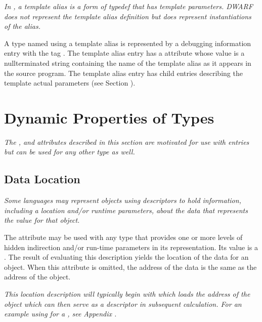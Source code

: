 \textit{In , a template alias is a form of typedef that has template
parameters.  DWARF does not represent the template alias definition
but does represent instantiations of the alias.}

A type named using a template alias is represented
by a debugging information entry 
with the tag
\DWTAGtemplatealiasTARG. 
The template alias entry has a
\DWATname{} attribute 
whose value is a null\dash terminated string
containing the name of the template alias as it appears in
the source program.
The template alias entry has child entries describing the template
actual parameters (see Section ).


\section{Dynamic Properties of Types}
\label{chap:dynamicpropertiesoftypes}
\textit{The \DWATdatalocation, \DWATallocated{} and \DWATassociated{}
attributes described in this section are motivated for use with
\DWTAGdynamictype{} entries but can be used for any other type as well.}

\subsection{Data Location}
\label{chap:datalocation}

\textit{Some languages may represent objects using descriptors to hold
information, including a location and/or run\dash time parameters,
about the data that represents the value for that object.}

\hypertarget{chap:DWATdatalocationindirectiontoactualdata}{}
The \DWATdatalocationDEFN{} attribute 
may be used with any type that provides one or more levels of 
hidden indirection
and/or run-time parameters in its representation. Its value
is a . 
The result of evaluating this
description yields the location of the data for an object.
When this attribute is omitted, the address of the data is
the same as the address of the object.

\textit{This location description will typically begin with
\DWOPpushobjectaddress{} 
which loads the address of the
object which can then serve as a descriptor in subsequent
calculation. For an example using 
\DWATdatalocation{} 
for a , see 
Appendix .}

